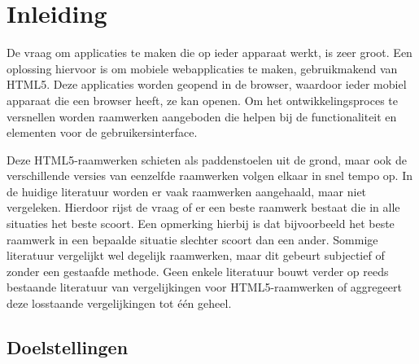\chapter{Inleiding} %
\label{inleiding}

De vraag om applicaties te maken die op ieder apparaat werkt, is zeer groot.
Een oplossing hiervoor is om mobiele webapplicaties te maken, gebruikmakend van HTML5.
Deze applicaties worden geopend in de browser, waardoor ieder mobiel apparaat die een browser heeft, ze kan openen.
Om het ontwikkelingsproces te versnellen worden raamwerken aangeboden die helpen bij de functionaliteit en elementen voor de gebruikersinterface. 

Deze HTML5-raamwerken schieten als paddenstoelen uit de grond, maar ook de verschillende versies van eenzelfde raamwerken volgen elkaar in snel tempo op.
In de huidige literatuur worden er vaak raamwerken aangehaald, maar niet vergeleken.
Hierdoor rijst de vraag of er een beste raamwerk bestaat die in alle situaties het beste scoort.
Een opmerking hierbij is dat bijvoorbeeld het beste raamwerk in een bepaalde situatie slechter scoort dan een ander.
Sommige literatuur vergelijkt wel degelijk raamwerken, maar dit gebeurt subjectief of zonder een gestaafde methode.
Geen enkele literatuur bouwt verder op reeds bestaande literatuur van vergelijkingen voor HTML5-raamwerken of aggregeert deze losstaande vergelijkingen tot één geheel.

\section{Doelstellingen} %

